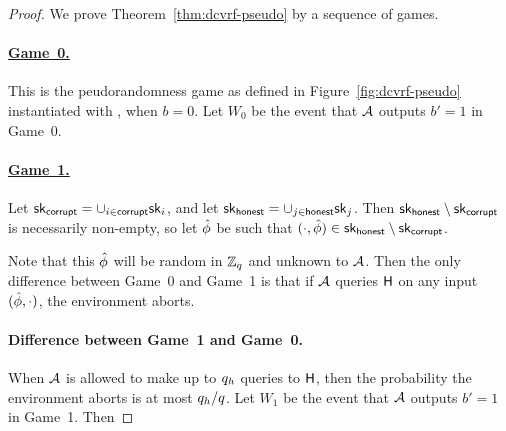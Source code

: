 \begin{proof}
  We prove Theorem~\ref{thm:dcvrf-pseudo} by a sequence of games.

  \paragraph{\underline{Game~0.}}
  This is the peudorandomness game as defined in Figure~\ref{fig:dcvrf-pseudo} instantiated with \DVRFOne,
  when $b=0$.
  Let $W_0$ be the event that $\mathcal{A}$ outputs $b'=1$ in Game~0.


  \paragraph{\underline{Game~1.}}
  Let $\mathsf{sk}_{\mathsf{corrupt}} = \cup_{i \in \mathsf{corrupt}} \mathsf{sk}_i$,
  and let $\mathsf{sk}_{\mathsf{honest}} = \cup_{j \in \mathsf{honest}} \mathsf{sk}_j$.
  Then $\mathsf{sk}_{\mathsf{honest}} \setminus \mathsf{sk}_{\mathsf{corrupt}}$ is necessarily non-empty, so let
  $\hat{\phi}$ be such that $(\cdot, \hat{\phi}) \in \mathsf{sk}_{\mathsf{honest}} \setminus \mathsf{sk}_{\mathsf{corrupt}}$.

  Note that this $\hat{\phi}$ will be random in $\mathbb{Z}_q$ and unknown to $\mathcal{A}$.
  Then the only difference between Game~0 and Game~1 is that
  if $\mathcal{A}$ queries $\mathsf{H}$ on any input $(\hat{\phi}, \cdot)$,
  the environment aborts.


  \paragraph{Difference between Game~1 and Game~0.}
  When $\mathcal{A}$ is allowed to make up to $q_h$ queries to $\mathsf{H}$,
  then the probability the environment aborts is at most $q_h/q$.
  Let $W_1$ be the event that $\mathcal{A}$ outputs $b'=1$ in Game~1.
  Then


\end{proof}
